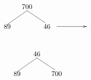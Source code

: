\begin{minipage}{0.3\textwidth}
\[\begin{xy}
,(0,0)*+=<10mm>[]\txt<2cm>{700}
,(-10,-10)*+=<10mm>[]\txt<2cm>{89}
,(10,-10)*+=<10mm>[]\txt<2cm>{46}

\ar@{->} (15,-10);(30,-10)
\ar@{-} (0,-2);(-10,-9) %
\ar@{-} (0,-2);(9,-8) %
\end{xy}\]
\end{minipage}
\begin{minipage}{0.5\textwidth}
\[\begin{xy}
,(0,0)*+=<10mm>[]\txt<2cm>{46}
,(-10,-10)*+=<10mm>[]\txt<2cm>{89}
,(10,-10)*+=<10mm>[]\txt<2cm>{700}

\ar@{-} (0,-2);(-10,-9) %
\ar@{-} (0,-2);(9,-8) %
\end{xy}\]
\end{minipage}
